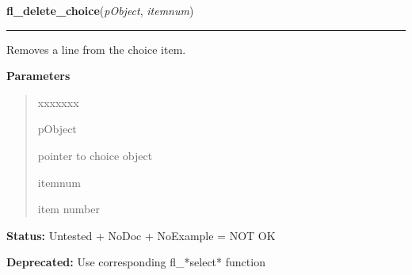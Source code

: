\hspace{.8\funcindent}\begin{boxedminipage}{\funcwidth}

    \raggedright \textbf{fl\_delete\_choice}(\textit{pObject}, \textit{itemnum})

    \vspace{-1.5ex}

    \rule{\textwidth}{0.5\fboxrule}
\setlength{\parskip}{2ex}
    Removes a line from the choice item.

\setlength{\parskip}{1ex}
      \textbf{Parameters}
      \vspace{-1ex}

      \begin{quote}
        \begin{Ventry}{xxxxxxx}

          \item[pObject]

          pointer to choice object

          \item[itemnum]

          item number

        \end{Ventry}

      \end{quote}

\textbf{Status:} Untested + NoDoc + NoExample = NOT OK



\textbf{Deprecated:} Use corresponding fl\_*select* function



    \end{boxedminipage}

    \label{xformslib:deprecated:fl_set_choice}

    \vspace{0.5ex}

